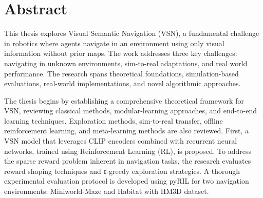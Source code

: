 %
%
%
% 
%
%
%
%

\chapter*{Abstract}
\label{cha:abstract}


This thesis explores Visual Semantic Navigation (VSN), a fundamental challenge in robotics where agents navigate in an environment using only visual information without prior maps.
The work addresses three key challenges: navigating in unknown environments, sim-to-real adaptations, and real world performance.
The research spans theoretical foundations, simulation-based evaluations, real-world implementations, and novel algorithmic approaches.

The thesis begins by establishing a comprehensive theoretical framework for VSN, reviewing classical methods, modular-learning approaches, and end-to-end learning techniques.
Exploration methods, sim-to-real transfer, offline reinforcement learning, and meta-learning methods are also reviewed.
First, a VSN model that leverages CLIP encoders combined with recurrent neural networks, trained using Reinforcement Learning (RL), is proposed.
To address the sparse reward problem inherent in navigation tasks, the research evaluates reward shaping techniques and ε-greedy exploration strategies.
A thorough experimental evaluation protocol is developed using pyRIL for two navigation environments: Miniworld-Maze and Habitat with HM3D dataset.

